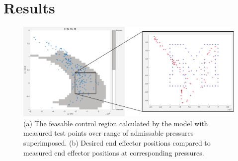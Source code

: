 \section{Results}   \label{sec:results}



\begin{figure}
    \centering
    \includegraphics[width=\linewidth]{figures/resultsDiagram.pdf}
    \caption{(a) The feasable control region calculated by the model with measured test points over range of admissable pressures superimposed. (b) Desired end effector positions compared to measured end effector positions at corresponding pressures. }
    \label{fig:results}
\end{figure}

